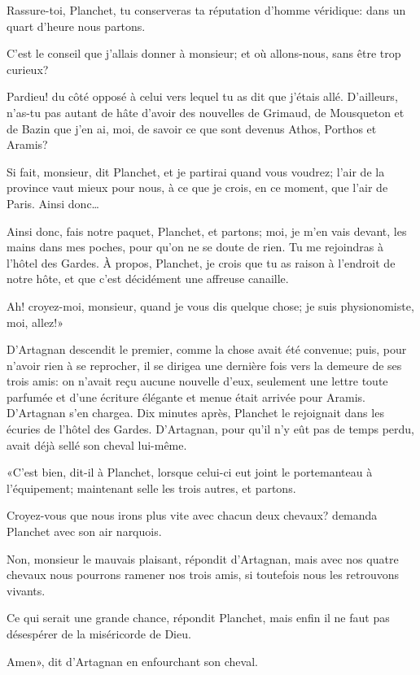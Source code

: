 \speak  Rassure-toi, Planchet, tu conserveras ta réputation d'homme véridique: dans un quart d'heure nous partons. 

\speak  C'est le conseil que j'allais donner à monsieur; et où allons-nous, sans être trop curieux? 

\speak  Pardieu! du côté opposé à celui vers lequel tu as dit que j'étais allé. D'ailleurs, n'as-tu pas autant de hâte d'avoir des nouvelles de Grimaud, de Mousqueton et de Bazin que j'en ai, moi, de savoir ce que sont devenus Athos, Porthos et Aramis? 

\speak  Si fait, monsieur, dit Planchet, et je partirai quand vous voudrez; l'air de la province vaut mieux pour nous, à ce que je crois, en ce moment, que l'air de Paris. Ainsi donc\dots 

\speak  Ainsi donc, fais notre paquet, Planchet, et partons; moi, je m'en vais devant, les mains dans mes poches, pour qu'on ne se doute de rien. Tu me rejoindras à l'hôtel des Gardes. À propos, Planchet, je crois que tu as raison à l'endroit de notre hôte, et que c'est décidément une affreuse canaille. 

\speak  Ah! croyez-moi, monsieur, quand je vous dis quelque chose; je suis physionomiste, moi, allez!» 

D'Artagnan descendit le premier, comme la chose avait été convenue; puis, pour n'avoir rien à se reprocher, il se dirigea une dernière fois vers la demeure de ses trois amis: on n'avait reçu aucune nouvelle d'eux, seulement une lettre toute parfumée et d'une écriture élégante et menue était arrivée pour Aramis. D'Artagnan s'en chargea. Dix minutes après, Planchet le rejoignait dans les écuries de l'hôtel des Gardes. D'Artagnan, pour qu'il n'y eût pas de temps perdu, avait déjà sellé son cheval lui-même. 

«C'est bien, dit-il à Planchet, lorsque celui-ci eut joint le portemanteau à l'équipement; maintenant selle les trois autres, et partons. 

\speak  Croyez-vous que nous irons plus vite avec chacun deux chevaux? demanda Planchet avec son air narquois. 

\speak  Non, monsieur le mauvais plaisant, répondit d'Artagnan, mais avec nos quatre chevaux nous pourrons ramener nos trois amis, si toutefois nous les retrouvons vivants. 

\speak  Ce qui serait une grande chance, répondit Planchet, mais enfin il ne faut pas désespérer de la miséricorde de Dieu. 

\speak  Amen», dit d'Artagnan en enfourchant son cheval. 

